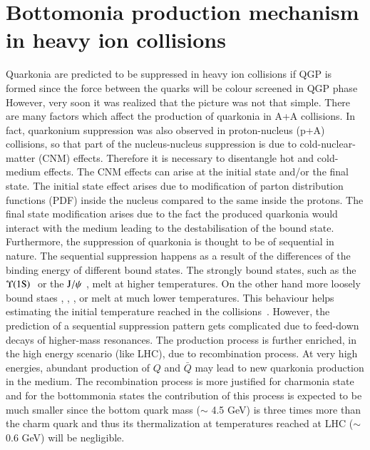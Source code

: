 \section{Bottomonia production mechanism in heavy ion collisions}
\label{sec:Bottomonia_hi}

Quarkonia are predicted to be suppressed in heavy ion collisions
if QGP is formed since the force between the quarks will be colour screened
in QGP phase~\cite{Matsui:1986dk} 
 However, very soon it was realized that the picture was not that simple.
There are many factors which affect the production of quarkonia in A+A collisions. 
In fact, quarkonium suppression was also observed in proton-nucleus (p+A)
collisions, so that part of the nucleus-nucleus suppression is due to 
cold-nuclear-matter (CNM) effects. Therefore it is necessary to disentangle hot 
and cold-medium effects. The CNM effects can arise at the initial
state and/or the final state. The initial state effect
arises due to modification of parton distribution functions (PDF) inside the nucleus
compared to the same inside the protons. The final state modification 
arises due to the  fact the produced quarkonia would interact with the medium
leading to the destabilisation of the bound state. Furthermore, the suppression of
quarkonia is thought to be of sequential in nature.  The sequential suppression
happens as a result of the differences of the  binding energy of different bound states. 
The strongly bound states, such as the $\Upsilon\mathrm{(1S)}\hspace {0.05in}$ or the $\mathrm{J}/\psi\hspace {0.05in}$,  melt at higher 
temperatures. On the other hand  more loosely bound staes \psiP, \chic, \chib, 
\upsb or \upsc  melt at much lower temperatures.  This behaviour helps  
 estimating the initial temperature reached in 
the collisions~\cite{Digal:2001ue}. However, the prediction of a sequential 
suppression pattern gets complicated due to feed-down 
decays of higher-mass resonances. The production process is further 
enriched, in the high energy scenario (like LHC), due to recombination process. At very 
high energies, abundant production of $Q$ and $\bar Q$ may lead to new quarkonia production 
in the medium. The recombination process is more justified for charmonia state and 
for the bottommonia states the contribution of this process is expected to be much
smaller since the bottom quark mass ($\sim$ 4.5 GeV) is three times more than the
charm quark and thus its thermalization at temperatures reached at LHC
($\sim$ 0.6 GeV) will be negligible. 





